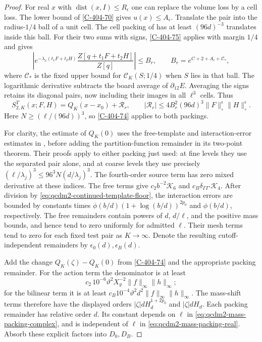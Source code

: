\documentclass[11pt,letterpaper,reqno]{amsart}
\theoremstyle{definition}
\theoremstyle{remark}
\begin{document}
\begin{proof}
For real \(x\) with \(\operatorname{dist}(x,I)\le R_\epsilon\)
one can replace the volume loss by a cell loss.
The lower bound of \cref{C-404-70} gives \(u(x)\le A_\epsilon\).
Translate the pair into the radius-\(1/4\) ball of a unit
cell. The cell packing of \cite[Lem. 11.2 and its proof]{QCDM1} has at least \((96d)^{-3}\) translates
inside this ball. For their two sums with signs,
\cref{C-404-75} applies with margin \(1/4\) and gives
\[
 \left|e^{-\lambda_x(t_1F+t_2H)}
          \frac{Z[q+t_1F+t_2H]}{Z[q]}\right|
       \le B_r,\qquad
 B_r=e^{C+2+A_\epsilon+\mathscr C_*},
\]
where \(\mathscr C_*\) is the fixed upper bound for
\(\mathscr C_K(S;1/4)\) when \(S\) lies in that ball.
The logarithmic derivative subtracts the board average
of \(\partial_{12}E\). Averaging the signs retains its
diagonal pairs, now including their images in all
\(\ell^3\) cells. Thus
\begin{equation}\label{eq:qcdm2-mass-packing-real}
 S^T_{2,K}(x;F,H)=Q_K(x-x_0)+\mathcal R_r,\qquad
 |\mathcal R_r|\le4B_r^2(96d)^3
                   \|F\|_\circ^\epsilon\|H\|_\circ^\epsilon.
\end{equation}
Here \(N\ge(\ell/(96d))^3\), so \cref{C-404-74}
applies to both packings.

For clarity, the estimate of \(Q_K(0)\) uses the free-template and interaction-error estimates in
\cite[proofs of Lems. 11.5 and 11.6]{QCDM1}, before adding
the partition-function remainder in its two-point theorem.
Their proofs apply to either packing just used: at fine
levels they use the separated pair alone, and at coarse
levels they use precisely
\((\ell/\lambda_j)^3\le96^3N(d/\lambda_j)^3\).
The fourth-order source term has zero mixed derivative at
these indices. The free terms give \(c_2b^{-2}\mathcal K_6\)
and \(c_B\delta_{\Gamma\Gamma'}\mathcal K_4\).
After division by
\eqref{eq:qcdm2-continued-template-floor}, the interaction
errors are bounded by constants times
\(\phi(b/d)(1+\log(b/d))^{2p_0}\) and
\(\phi(b/d)\), respectively. The free remainders contain
powers of \(d\), \(d/\ell\), and the positive mass bounds,
and hence tend to zero uniformly for admitted \(\ell\).
Their mesh terms tend to zero for each fixed test pair
as \(K\to\infty\). Denote the resulting cutoff-independent
remainders by \(\epsilon_0(d),\epsilon_B(d)\).

Add the change \(Q_K(\zeta)-Q_K(0)\) from
\cref{C-404-74} and the appropriate packing remainder.
For the action term the denominator is at least
\[
 c_2\,10^{-6}\vartheta^2X_g^{-2}
                      \|f\|_\infty\|h\|_\infty;
\]
for the bilinear term it is at least
\(c_B10^{-4}\vartheta^2d^2\|f\|_\infty\|h\|_\infty\).
The mass-shift terms therefore have the displayed orders
\(|\zeta|dH_d^{1+2p_0}\) and \(|\zeta|dH_d\).
Each packing remainder has relative order \(d\).
Its constant depends on \(\ell\) in
\eqref{eq:qcdm2-mass-packing-complex}, and is independent
of \(\ell\) in \eqref{eq:qcdm2-mass-packing-real}.
Absorb these explicit factors into \(D_0,D_B\).


\end{proof}
\end{document}
